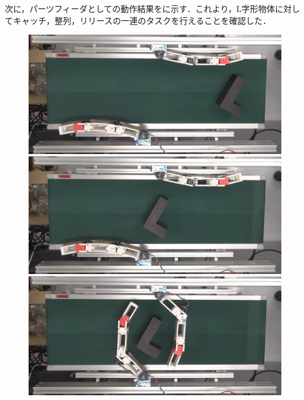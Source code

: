 \documentclass[a4paper,twoside,12pt,papersize, dvipdfmx]{iirthesis}
\begin{document}
次に，パーツフィーダとしての動作結果をに示す．これより，L字形物体に対してキャッチ，整列，リリースの一連のタスクを行えることを確認した．
\begin{figure}[hb]
\centering
\begin{minipage}{0.49\hsize}
\includegraphics[width=0.98\hsize]{fig/4-manipulation-result/LShape/3-1.jpg}
\subcaption{}
\end{minipage}\hfill
\begin{minipage}{0.49\hsize}
\includegraphics[width=0.98\hsize]{fig/4-manipulation-result/LShape/3-2.jpg}
\subcaption{}
\end{minipage}\hfill
\begin{minipage}{0.49\hsize}
\includegraphics[width=0.98\hsize]{fig/4-manipulation-result/LShape/3-3.jpg}

\end{minipage}
\end{figure}
\end{document}
